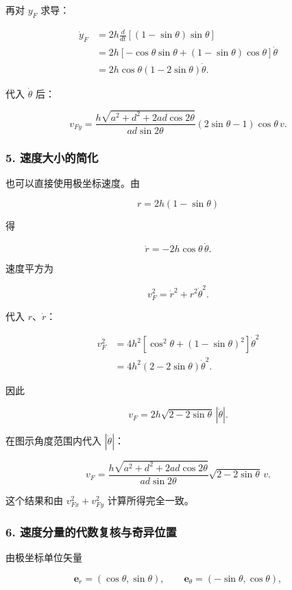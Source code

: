 \documentclass[12pt,a4paper,UTF8]{ctexart}
\begin{document}
再对 \(y_F\) 求导：

\[
\begin{aligned}
\dot y_F
&=2h\frac{d}{dt}\left[(1-\sin\theta)\sin\theta\right]\\
&=2h\left[-\cos\theta\sin\theta+(1-\sin\theta)\cos\theta\right]\dot\theta\\
&=2h\cos\theta(1-2\sin\theta)\dot\theta.
\end{aligned}
\]

代入 \(\dot\theta\) 后：

\[
\boxed{
v_{Fy}
=\frac{h\sqrt{a^2+d^2+2ad\cos2\theta}}
{ad\sin2\theta}
(2\sin\theta-1)\cos\theta\,v
}.
\]

\subsubsection{5.
速度大小的简化}\label{ux901fux5ea6ux5927ux5c0fux7684ux7b80ux5316}

也可以直接使用极坐标速度。由

\[
r=2h(1-\sin\theta)
\]

得

\[
\dot r=-2h\cos\theta\,\dot\theta.
\]

速度平方为

\[
v_F^2=\dot r^2+r^2\dot\theta^2.
\]

代入 \(r\)、\(\dot r\)：

\[
\begin{aligned}
v_F^2
&=4h^2\left[\cos^2\theta+(1-\sin\theta)^2\right]\dot\theta^2\\
&=4h^2(2-2\sin\theta)\dot\theta^2.
\end{aligned}
\]

因此

\[
v_F=2h\sqrt{2-2\sin\theta}\,|\dot\theta|.
\]

在图示角度范围内代入 \(|\dot\theta|\)：

\[
\boxed{
v_F=
\frac{h\sqrt{a^2+d^2+2ad\cos2\theta}}
{ad\sin2\theta}
\sqrt{2-2\sin\theta}\,v
}.
\]

这个结果和由 \(v_{Fx}^2+v_{Fy}^2\) 计算所得完全一致。

\subsubsection{6.
速度分量的代数复核与奇异位置}\label{ux901fux5ea6ux5206ux91cfux7684ux4ee3ux6570ux590dux6838ux4e0eux5947ux5f02ux4f4dux7f6e}

由极坐标单位矢量

\[
\bm e_r=(\cos\theta,\sin\theta),
\qquad
\bm e_\theta=(-\sin\theta,\cos\theta),
\]
\end{document}
